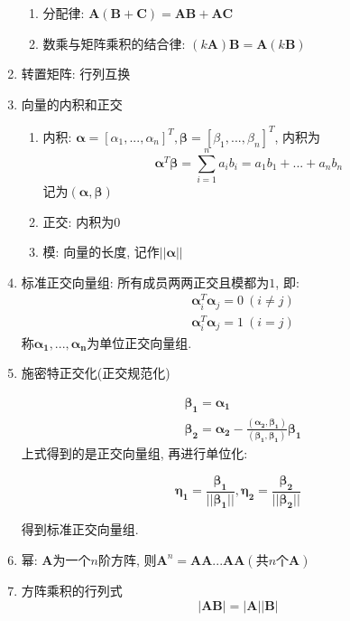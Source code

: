 \begin{enumerate}
\begin{enumerate}
    	\item 分配律: $ \bm{A}(\bm{B}+\bm{C})=\bm{A}\bm{B}+\bm{A}\bm{C} $
    	\item 数乘与矩阵乘积的结合律: $ (k\bm{A})\bm{B}=\bm{A}(k\bm{B}) $
    \end{enumerate}
    \item 转置矩阵: 行列互换
    \item 向量的内积和正交
    \begin{enumerate}
    	\item 内积: $ \bm{\alpha} = [\alpha_{1},...,\alpha_{n}]^{T}, \bm{\beta} = [\beta_{1},...,\beta_{n}]^{T} $, 内积为
    	\begin{equation*}
    		\bm{\alpha}^{T}\bm{\beta}=\sum_{i=1}^{n}a_{i}b_{i}=a_{1}b_{1}+...+a_{n}b_{n}
    	\end{equation*}
        记为$ (\bm{\alpha},\bm{\beta}) $
    	\item 正交: 内积为$ 0 $
    	\item 模: 向量的长度, 记作$ ||\bm{\alpha}|| $
    \end{enumerate}
    \item 标准正交向量组: 所有成员两两正交且模都为$ 1 $, 即:
    \begin{equation*}
    	\begin{aligned}
    		 &\bm{\alpha}_{i}^{T}\bm{\alpha}_{j}=0\ (i\neq j)\\&\bm{\alpha}_{i}^{T}\bm{\alpha}_{j}=1\ (i=j)
    	\end{aligned}
    \end{equation*}
    称$ \bm{\alpha_{1}},...,\bm{\alpha_{n}} $为单位正交向量组.
    \item 施密特正交化(正交规范化)\par
    \begin{equation*}
    	\begin{aligned}
    		&\bm{\beta_{1}}=\bm{\alpha_{1}}\\&\bm{\beta_{2}}=\bm{\alpha_{2}}-\frac{(\bm{\alpha_{2}},\bm{\beta_{1}})}{(\bm{\beta_{1}},\bm{\beta_{1}})}\bm{\beta_{1}}
    	\end{aligned}
    \end{equation*}
    上式得到的是正交向量组, 再进行单位化:\par
    \begin{equation*}
    	\bm{\eta_{1}}=\frac{\bm{\beta_{1}}}{||\bm{\beta_{1}}||}, \bm{\eta_{2}}=\frac{\bm{\beta_{2}}}{||\bm{\beta_{2}}||}
    \end{equation*}\par
    得到标准正交向量组.
    \item 幂: $ \bm{A} $为一个$ n $阶方阵, 则$ \bm{A}^{n}=\bm{A}\bm{A}...\bm{A}\bm{A}(\text{共}n\text{个}\bm{A}) $
    \item 方阵乘积的行列式
    \begin{equation*}
    	|\bm{A}\bm{B}|=|\bm{A}||\bm{B}|
    \end{equation*}
\end{enumerate}
